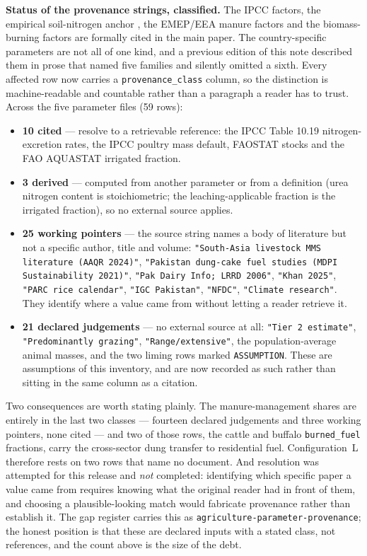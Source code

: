 \medskip\noindent\textbf{Status of the provenance strings, classified.} The IPCC factors,
the empirical soil-nitrogen anchor \citep{cui2021}, the EMEP/EEA manure factors
\citep{emep2019,sommer2019} and the biomass-burning factors \citep{akagi2011} are formally
cited in the main paper. The country-specific parameters are not all of one kind, and a
previous edition of this note described them in prose that named five families and silently
omitted a sixth. Every affected row now carries a \texttt{provenance\_class} column, so the
distinction is machine-readable and countable rather than a paragraph a reader has to trust.
Across the five parameter files (59 rows):

\begin{itemize}\itemsep2pt
\item \textbf{10 cited} --- resolve to a retrievable reference: the IPCC Table 10.19
  nitrogen-excretion rates, the IPCC poultry mass default, FAOSTAT stocks and the FAO
  AQUASTAT irrigated fraction.
\item \textbf{3 derived} --- computed from another parameter or from a definition
  (urea nitrogen content is stoichiometric; the leaching-applicable fraction is the
  irrigated fraction), so no external source applies.
\item \textbf{25 working pointers} --- the source string names a body of literature but
  not a specific author, title and volume: \texttt{"South-Asia livestock MMS literature
  (AAQR 2024)"}, \texttt{"Pakistan dung-cake fuel studies (MDPI Sustainability 2021)"},
  \texttt{"Pak Dairy Info; LRRD 2006"}, \texttt{"Khan 2025"}, \texttt{"PARC rice
  calendar"}, \texttt{"IGC Pakistan"}, \texttt{"NFDC"}, \texttt{"Climate research"}.
  They identify where a value came from without letting a reader retrieve it.
\item \textbf{21 declared judgements} --- no external source at all: \texttt{"Tier 2
  estimate"}, \texttt{"Predominantly grazing"}, \texttt{"Range/extensive"}, the
  population-average animal masses, and the two liming rows marked \texttt{ASSUMPTION}.
  These are assumptions of this inventory, and are now recorded as such rather than
  sitting in the same column as a citation.
\end{itemize}

Two consequences are worth stating plainly. The manure-management shares are entirely in the
last two classes --- fourteen declared judgements and three working pointers, none cited ---
and two of those rows, the cattle and buffalo \texttt{burned\_fuel} fractions, carry the
cross-sector dung transfer to residential fuel. Configuration~L therefore rests on two rows
that name no document. And resolution was attempted for this release and \emph{not}
completed: identifying which specific paper a value came from requires knowing what the
original reader had in front of them, and choosing a plausible-looking match would fabricate
provenance rather than establish it. The gap register carries this as
\texttt{agriculture-parameter-provenance}; the honest position is that these are declared
inputs with a stated class, not references, and the count above is the size of the debt.
